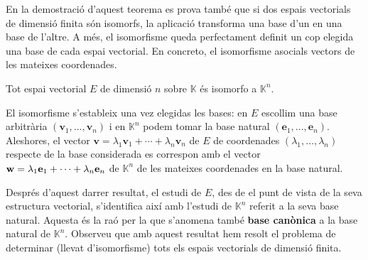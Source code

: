 \begin{observacio}
En la demostració d’aquest teorema es prova també que si dos
espais vectorials de dimensió finita són isomorfs, la aplicació transforma una base d’un en una base de l'altre. A més, el
isomorfisme queda perfectament definit un cop elegida una base de cada
espai vectorial. En concreto, el isomorfisme asocials vectors de les
mateixes coordenades.
\end{observacio}

\begin{corollari}
Tot espai vectorial $E$ de dimensió $n$ sobre $\mathbb{K}$
és isomorfo a $\mathbb{K}^{n}$.

\end{corollari}
\begin{prova}
El isomorfisme s’estableix una vez elegidas les bases: en $E$
escollim una base arbitrària $(\mathbf{v}_{1},...,\mathbf{v}_{n})$ i en $%
\mathbb{K}^{n}$ podem tomar la base natural $(\mathbf{e}_{1},...,\mathbf{e}%
_{n})$. Aleshores, el vector $\mathbf{v}=\lambda _{1}\mathbf{v}_{1}+\cdots
+\lambda _{n}\mathbf{v}_{n}$ de $E$ de coordenades $(\lambda
_{1},...,\lambda _{n})$ respecte de la base considerada es correspon amb
el vector $\mathbf{w}=\lambda _{1}\mathbf{e}_{1}+\cdots +\lambda _{n}\mathbf{%
e}_{n}$ de $\mathbb{K}^{n}$ de les mateixes coordenades en la base natural.
\end{prova}

\begin{observacio}
Després d’aquest darrer resultat, el estudi de $E$, des de
el punt de vista de la seva estructura vectorial, s'identifica així amb
l'estudi de $\mathbb{K}^{n}$ referit a la seva base natural. Aquesta és la raó
per la que s’anomena també \textbf{base canònica} a la base
natural de $\mathbb{K}^{n}$. Observeu que amb aquest resultat hem
resolt el problema de determinar (llevat d'isomorfisme) tots els espais
vectorials de dimensió finita.
\end{observacio}

